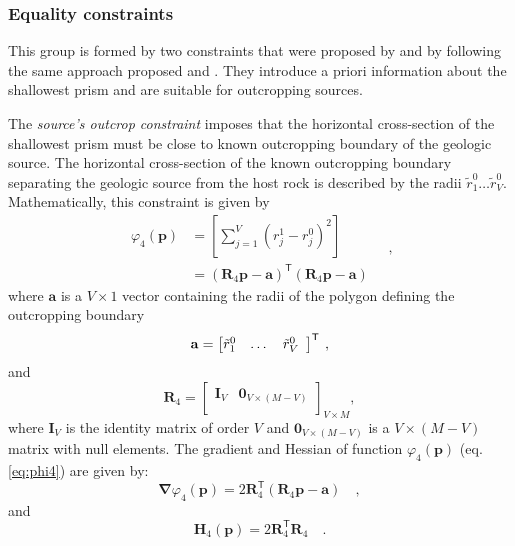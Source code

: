 \subsubsection{Equality constraints}

This group is formed by two constraints that were proposed by \cite{oliveirajr-etal2011} and \cite{oliveirajr-barbosa2013} by following the same approach proposed \cite{barbosa-etal1997} and \cite{barbosa-1999a}. 
They introduce a priori information about the shallowest prism and are suitable for outcropping sources.

The \textit{source’s outcrop constraint} imposes that the horizontal cross-section of the shallowest prism must be close to known outcropping boundary of the geologic source.
The horizontal cross-section of the known outcropping boundary separating the geologic source from the host rock is described by the radii $\tilde{r}_{1}^{0} \dots \tilde{r}_{V}^{0}$. Mathematically, this constraint is given by
\begin{equation}\label{eq:phi4}
\begin{split}
\varphi_{4}(\mathbf{p}) &= \left[ \sum\limits^{V}_{j=1}\left(r^{1}_{j}-r^{0}_{j}\right)^2\right] \\
&= \left(\mathbf{R}_{4} \mathbf{p} - \mathbf{a} \right)^{\mathsf{T}} 
\left(\mathbf{R}_{4} \mathbf{p} - \mathbf{a} \right)
\end{split} \quad ,
\end{equation}
where $\mathbf{a}$ is a $V \times 1$ vector containing the radii of the polygon defining the outcropping boundary
\begin{equation}
\mathbf{a} = \left[ \begin{array}{@{}*{12}{c}@{}}
\tilde{r}_{1}^{0} & \dots & \tilde{r}_{V}^{0} \\
\end{array} \right]^{\mathsf{T}} \: ,
\label{eq:a-vector}
\end{equation}
and
\begin{equation}
\mathbf{R}_{4} = 
\begin{bmatrix}
\mathbf{I}_{V} & \mathbf{0}_{V \times (M-V)} \\
\end{bmatrix}_{V\times M},
\label{eq:R4-matrix}
\end{equation}
where $\mathbf{I}_{V}$ is the identity matrix of order $V$ and 
$\mathbf{0}_{V \times (M-V)}$ is a $V \times (M-V)$ matrix with null elements.
The gradient and Hessian of function $\varphi_{4}(\mathbf{p})$ (eq. \ref{eq:phi4}) are given by:
\begin{equation}\label{eq:phi4_grad}
\boldsymbol{\nabla}\varphi_{4}(\mathbf{p}) = 2 \mathbf{R}_{4}^{\mathsf{T}} 
\left(\mathbf{R}_{4} \mathbf{p} - \mathbf{a} \right) \quad ,
\end{equation}
and
\begin{equation}\label{eq:phi4_hessian}
\mathbf{H}_{4}(\mathbf{p}) = 2 \mathbf{R}^{\mathsf{T}}_{4}\mathbf{R}_{4} \quad .
\end{equation}

